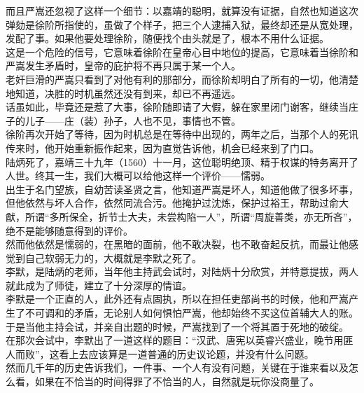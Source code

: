 \begin{multicols}{\theparacolNo}
而且严嵩还忽视了这样一个细节：以嘉靖的聪明，就算没有证据，自然也知道这次弹劾是徐阶所指使的，虽做了个样子，把三个人逮捕入狱，最终却还是从宽处理，发配了事。如果他要处理徐阶，随便找个由头就是了，根本不用什么证据。\\

这是一个危险的信号，它意味着徐阶在皇帝心目中地位的提高，它意味着当徐阶和严嵩发生矛盾时，皇帝的庇护将不再只属于某一个人。\\

老奸巨滑的严嵩只看到了对他有利的那部分，而徐阶却明白了所有的一切，他清楚地知道，决胜的时机虽然还没有到来，却已不再遥远。\\

话虽如此，毕竟还是惹了大事，徐阶随即请了大假，躲在家里闭门谢客，继续当庄子的儿子——庄（装）孙子，人也不见，事情也不管。\\

徐阶再次开始了等待，因为时机总是在等待中出现的，两年之后，当那个人的死讯传来时，他开始重新振作起来，因为直觉告诉他，机会已经来到了门口。\\

陆炳死了，嘉靖三十九年（1560）十一月，这位聪明绝顶、精于权谋的特务离开了人世。终其一生，我们大概可以给他这样一个评价——懦弱。\\

出生于名门望族，自幼苦读圣贤之言，他知道严嵩是坏人，知道他做了很多坏事，但他依然与坏人合作，依然同流合污。他掩护过沈炼，保护过裕王，帮助过俞大猷，所谓“多所保全，折节士大夫，未尝构陷一人”，所谓“周旋善类，亦无所吝”，绝不是能够随意得到的评价。\\

然而他依然是懦弱的，在黑暗的面前，他不敢决裂，也不敢奋起反抗，而最让他感觉到自己软弱无力的，大概就是李默之死了。\\

李默，是陆炳的老师，当年他主持武会试时，对陆炳十分欣赏，并特意提拔，两人就此成为了师徒，建立了十分深厚的情谊。\\

李默是一个正直的人，此外还有点固执，所以在担任吏部尚书的时候，他和严嵩产生了不可调和的矛盾，无论别人如何惧怕严嵩，他却始终不买这位首辅大人的账。于是当他主持会试，并亲自出题的时候，严嵩找到了一个将其置于死地的破绽。\\

在那次会试中，李默出了一道这样的题目：“汉武、唐宪以英睿兴盛业，晚节用匪人而败”，这看上去应该算是一道普通的历史议论题，并没有什么问题。\\

然而几千年的历史告诉我们，一件事、一个人有没有问题，关键在于谁来看以及怎么看，如果在不恰当的时间得罪了不恰当的人，自然就是玩你没商量了。\\


\end{multicols}

